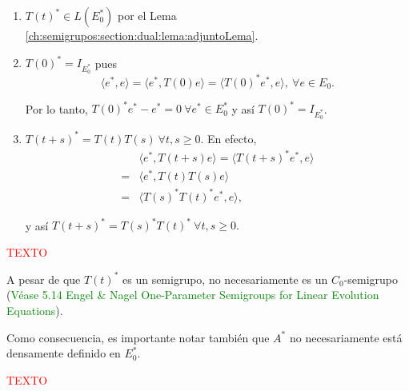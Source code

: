 \begin{enumerate}
    \item $T(t)^* \in L(E_0^*)$ por el Lema \ref{ch:semigrupos:section:dual:lema:adjuntoLema}.

    \item $T(0)^* = I_{E_0^*}$ pues 
    \[\langle e^*, e \rangle = \langle e^*, T(0)e \rangle = \langle T(0)^*e^*, e \rangle ,\ \forall e \in E_0.\]

    Por lo tanto, $T(0)^*e^* - e^* = 0 \ \forall e^* \in E_0^*$ y así $T(0)^* = I_{E_0^*}$.

    \item $T(t+s)^* = T(t)T(s) \ \forall t ,s \geq 0$. En efecto, 
    \begin{align*}
        &\langle e^*, T(t+s)e \rangle = \langle T(t+s)^*e^*, e \rangle\\
        =&\langle e^*, T(t)T(s)e \rangle\\
        =&\langle T(s)^*T(t)^*e^*, e \rangle,
    \end{align*}

    y así $T(t+s)^* = T(s)^*T(t)^* \ \forall t,s \geq 0.$
\end{enumerate}

\textcolor{red}{TEXTO}\\

\begin{Observacion}
    \label{ObsC0Dual}

    A pesar de que $T(t)^*$ es un semigrupo, no necesariamente es un $C_0$-semigrupo (\textcolor{green}{Véase 5.14 Engel \& Nagel One-Parameter Semigroups for Linear Evolution Equations}). 

    Como consecuencia, es importante notar también que $A^*$ no necesariamente está densamente definido en $E_0^*$.
\end{Observacion}

\textcolor{red}{TEXTO}

